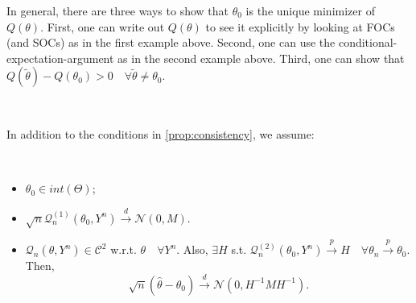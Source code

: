 In general, there are three ways to show that $\theta_0$ is the unique minimizer of $Q(\theta)$.
First, one can write out $Q(\theta)$ to see it explicitly by looking at FOCs (and SOCs) as in the first example
above. Second, one can use the conditional-expectation-argument as in the second example
above. Third, one can show that $Q(\tilde{\theta}) - Q(\theta_0) > 0 \quad \forall \tilde{\theta} \neq \theta_0$.

\begin{proposition}
    \
    
    In addition to the conditions in \ref{prop:consistency}, we assume:
    \begin{assumption}
        \

        \begin{itemize}
            \item $\theta_0 \in int(\Theta)$;
            \item $\sqrt{n} \mathcal{Q}_n^{(1)}(\theta_0, Y^n) \overset{d}{\rightarrow} \mathcal{N}(0, M)$.
            \item $\mathcal{Q}_n(\theta, Y^n) \in \mathcal{C}^2$ w.r.t. $\theta\quad \forall Y^n$.
            Also, $\exists H$ s.t. $\mathcal{Q}_n^{(2)}(\theta_0, Y^n) \overset{p}{\rightarrow}H \quad \forall \theta_n \overset{p}{\rightarrow}\theta_0$.
            Then,
            \[
            \sqrt{n}(\hat{\theta} - \theta_0) \overset{d}{\rightarrow} \mathcal{N}(0, H^{-1} M H^{-1}).
            \]
        \end{itemize}
    \end{assumption}
\end{proposition}

